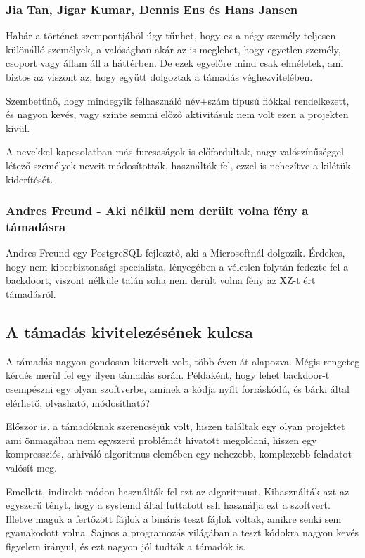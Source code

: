 \documentclass[11pt]{article}
\begin{document}
\subsubsection{Jia Tan, Jigar Kumar,  Dennis Ens és Hans Jansen}

Habár a történet szempontjából úgy tűnhet, hogy ez a négy személy teljesen különálló személyek, a valóságban akár az is meglehet, hogy egyetlen személy, csoport vagy állam áll a háttérben. De ezek egyelőre mind csak elméletek, ami biztos az viszont az, hogy együtt dolgoztak a támadás véghezvitelében. 

Szembetűnő, hogy mindegyik felhasználó név+szám típusú fiókkal rendelkezett, és nagyon kevés, vagy szinte semmi előző aktivitásuk nem volt ezen a projekten kívül.

A nevekkel kapcsolatban más furcsaságok is előfordultak, nagy valószínűséggel létező személyek neveit módosították, használták fel, ezzel is nehezítve a kilétük kiderítését.


\subsubsection{Andres Freund - Aki nélkül nem derült volna fény a támadásra}

Andres Freund egy PostgreSQL fejlesztő, aki a Microsoftnál dolgozik. Érdekes, hogy nem kiberbiztonsági specialista, lényegében a véletlen folytán fedezte fel a backdoort, viszont nélküle talán soha nem derült volna fény az XZ-t ért támadásról.

\subsection{A támadás kivitelezésének kulcsa}

A támadás nagyon gondosan kitervelt volt, több éven át alapozva.
Mégis rengeteg kérdés merül fel egy ilyen támadás során. Példaként, hogy lehet backdoor-t csempészni egy olyan szoftverbe, aminek a kódja nyílt forráskódú, és bárki által elérhető, olvasható, módosítható?

Először is, a támadóknak szerencséjük volt, hiszen találtak egy olyan projektet ami önmagában nem egyszerű problémát hivatott megoldani, hiszen egy kompressziós, arhiváló algoritmus elemében egy nehezebb, komplexebb feladatot valósít meg.

Emellett, indirekt módon használták fel ezt az algoritmust. Kihasználták azt az egyszerű tényt, hogy a systemd által futtatott ssh használja ezt a szoftvert.
Illetve maguk a fertőzött fájlok a bináris teszt fájlok voltak, amikre senki sem gyanakodott volna.
Sajnos a programozás világában a teszt kódokra nagyon kevés figyelem irányul, és ezt nagyon jól tudták a támadók is.
\end{document}
